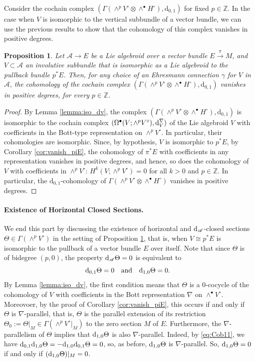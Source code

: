 \documentclass[12pt,letterpaper]{article}
\newcommand{\Z}{\mathbb{Z}}
\newcommand{\A}{\mathscr{A}}
\let\oldd\d
\renewcommand{\d}{%
  \relax\ifmmode\mathrm{d}\else\oldd\fi
}
\renewcommand{\dh}{%
  \relax\ifmmode\mathrm{d}_{1,0}\else\olddh\fi
}
\newcommand{\dv}{\mathrm{d}_{0,1}}
\newtheorem{proposition}[theorem]{Proposition}
\numberwithin{equation}{section}
\begin{document}
Consider the cochain complex $(\Gamma(\wedge^p V^\circ \otimes \wedge^{\bullet}H^\circ),\dv)$ for fixed $p\in\Z$.
In the case when $V$ is isomorphic to the vertical subbundle of a vector bundle, 
we can use the previous results to show that the cohomology of this complex vanishes in positive degrees.

\begin{proposition}\label{vanishprop}
  Let $\A\to E$ be a Lie algebroid over a vector bundle $E\overset{\pi}{\to} M$,
  and $V\subset\A$ an involutive subbundle that is isomorphic as a Lie algebroid to the pullback bundle $p^*E$.
  Then, for any choice of an Ehresmann connection $\gamma$ for $V$ in $\A$, the cohomology of the cochain complex 
  $(\Gamma(\wedge^p V^\circ \otimes \wedge^{\bullet}H^\circ),\dv)$ vanishes in positive degrees, for every $p\in\Z$.
\end{proposition}

\begin{proof}
  By Lemma \ref{lemma:iso_dv}, the complex $(\Gamma(\wedge^p V^\circ \otimes \wedge^{\bullet}H^\circ),\dv)$
  is isomorphic to the cochain complex $(\Omega^\bullet(V;\wedge^p V^\circ),\d_V^\nabla)$
  of the Lie algebroid $V$ with coefficients in the Bott-type representation on $\wedge^p V^\circ$.
  In particular, their cohomologies are isomorphic.
  Since, by hypothesis, $V$ is isomorphic to $p^*E$, 
  by Corollary \ref{cor:vanish_piE}, the cohomology of $\pi^*E$ with coefficients in any representation vanishes in positive degrees, 
  and hence, so does the cohomology of $V$ with coefficients in $\wedge^p V^\circ$:
  $H^k(V;\wedge^p V^\circ) = 0$ for all $k > 0$ and $p\in\Z$.
  In particular, the $\dv$-cohomology of $\Gamma(\wedge^p V^\circ \otimes \wedge^{\bullet}H^\circ)$ vanishes in positive degrees.
\end{proof}

\iffalse
\paragraph{Existence of Horizontal Closed Sections.} 
We end this part by discussing the existence of horizontal and $\d_\A$-closed sections $\Theta\in\Gamma(\wedge^pV^\circ)$ in the setting of Proposition \ref{vanishprop},
that is, when $V\cong p^*E$ is isomorphic to the pullback of a vector bundle $E$ over itself.
Note that since $\Theta$ is of bidegree $(p,0)$, the property $\d_\A\Theta=0$ is equivalent to 
\[
  \dv\Theta = 0 \quad \text{and} \quad \dh\Theta=0.
\]
By Lemma \ref{lemma:iso_dv}, the first condition means that $\Theta$ is a 0-cocycle of the cohomology of $V$ 
with coefficients in the Bott representation $\nabla$ on $\wedge^\bullet V^\circ$.
Moreovoer, by the proof of Corollary \ref{cor:vanish_piE}, this occurs if and only if $\Theta$ is $\nabla$-parallel, that is, 
$\Theta$ is the parallel extension of its restriction $\Theta_0:=\Theta|_M\in\Gamma(\wedge^pV^\circ|_M)$ to the zero section $M$ of $E$.
Furthermore, the $\nabla$-parallelism of $\Theta$ implies that $\dh\Theta$ is also $\nabla$-parallel.
Indeed, by \eqref{eq:Cob11}, we have $\dv\dh\Theta = -\dh\dv\Theta = 0$, so, as before, $\dh\Theta$ is $\nabla$-parallel.
So, $\dh\Theta=0$ if and only if $(\dh\Theta)|_M=0$.
\end{document}
